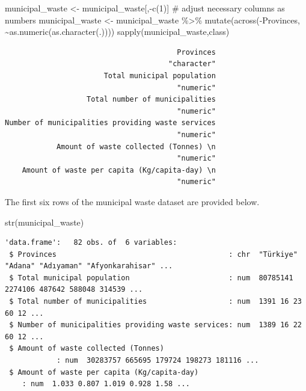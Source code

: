 \documentclass[
  11pt,
  a4paper,
  DIV=11,
  numbers=noendperiod]{scrartcl}
\newenvironment{Shaded}{\begin{snugshade}}{\end{snugshade}}
\newcommand{\CommentTok}[1]{\textcolor[rgb]{0.37,0.37,0.37}{#1}}
\newcommand{\DecValTok}[1]{\textcolor[rgb]{0.68,0.00,0.00}{#1}}
\newcommand{\FunctionTok}[1]{\textcolor[rgb]{0.28,0.35,0.67}{#1}}
\newcommand{\NormalTok}[1]{\textcolor[rgb]{0.00,0.23,0.31}{#1}}
\newcommand{\OtherTok}[1]{\textcolor[rgb]{0.00,0.23,0.31}{#1}}
\newcommand{\SpecialCharTok}[1]{\textcolor[rgb]{0.37,0.37,0.37}{#1}}
\begin{document}
\begin{Shaded}
\begin{Highlighting}[]
\NormalTok{municipal\_waste }\OtherTok{\textless{}{-}}\NormalTok{ municipal\_waste[,}\SpecialCharTok{{-}}\FunctionTok{c}\NormalTok{(}\DecValTok{1}\NormalTok{)]}
\CommentTok{\# adjust necessary columns as numbers}
\NormalTok{municipal\_waste }\OtherTok{\textless{}{-}}\NormalTok{ municipal\_waste }\SpecialCharTok{\%\textgreater{}\%}
  \FunctionTok{mutate}\NormalTok{(}\FunctionTok{across}\NormalTok{(}\SpecialCharTok{{-}}\NormalTok{Provinces, }\SpecialCharTok{\textasciitilde{}}\FunctionTok{as.numeric}\NormalTok{(}\FunctionTok{as.character}\NormalTok{(.))))}
\FunctionTok{sapply}\NormalTok{(municipal\_waste,class)}
\end{Highlighting}
\end{Shaded}

\begin{verbatim}
                                        Provinces 
                                      "character" 
                       Total municipal population 
                                        "numeric" 
                   Total number of municipalities 
                                        "numeric" 
Number of municipalities providing waste services 
                                        "numeric" 
            Amount of waste collected (Tonnes) \n 
                                        "numeric" 
    Amount of waste per capita (Kg/capita-day) \n 
                                        "numeric" 
\end{verbatim}

The first six rows of the municipal waste dataset are provided below.

\begin{Shaded}
\begin{Highlighting}[]
\FunctionTok{str}\NormalTok{(municipal\_waste)}
\end{Highlighting}
\end{Shaded}

\begin{verbatim}
'data.frame':   82 obs. of  6 variables:
 $ Provinces                                        : chr  "Türkiye" "Adana" "Adıyaman" "Afyonkarahisar" ...
 $ Total municipal population                       : num  80785141 2274106 487642 588048 314539 ...
 $ Total number of municipalities                   : num  1391 16 23 60 12 ...
 $ Number of municipalities providing waste services: num  1389 16 22 60 12 ...
 $ Amount of waste collected (Tonnes) 
            : num  30283757 665695 179724 198273 181116 ...
 $ Amount of waste per capita (Kg/capita-day) 
    : num  1.033 0.807 1.019 0.928 1.58 ...
\end{verbatim}
\end{document}
